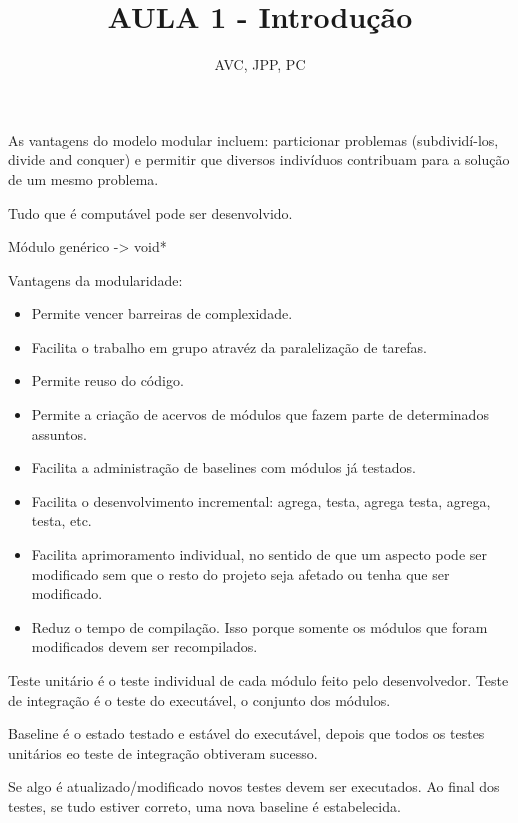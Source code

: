 \documentclass[
	12pt, %
]{fphw}
\title{AULA 1 - Introdução} %
\author{AVC, JPP, PC} %
\date{} %
\institute{Pontifícia Universidade Católica do Rio de Janeiro \\ Departamento de Informática} %
\begin{document}
\maketitle %

\begin{doublespace}
As vantagens do modelo modular incluem: particionar problemas (subdividí-los, divide and conquer) e permitir que diversos indivíduos contribuam para a solução de um mesmo problema.

Tudo que é computável pode ser desenvolvido.

Módulo genérico -> void*

Vantagens da modularidade:

\begin{itemize}

\item Permite vencer barreiras de complexidade.

\item Facilita o trabalho em grupo atravéz da paralelização de tarefas.

\item Permite reuso do código.

\item Permite a criação de acervos de módulos que fazem parte de determinados assuntos.

\item Facilita a administração de baselines com módulos já testados.

\item Facilita o desenvolvimento incremental: agrega, testa, agrega testa, agrega, testa, etc.

\item Facilita  aprimoramento individual, no sentido de que um aspecto pode ser modificado sem que o resto do projeto seja afetado ou tenha que ser modificado.

\item Reduz o tempo de compilação. Isso porque somente os módulos que foram modificados devem ser recompilados.

\end{itemize}

Teste unitário é o teste individual de cada módulo feito pelo desenvolvedor. Teste de integração é o teste do executável, o conjunto dos módulos.

Baseline é o estado testado e estável do executável, depois que todos os testes unitários eo teste de integração obtiveram sucesso.

Se algo é atualizado/modificado novos testes devem ser executados. Ao final dos testes, se tudo estiver correto, uma nova baseline é estabelecida.

\end{doublespace}
\end{document}
